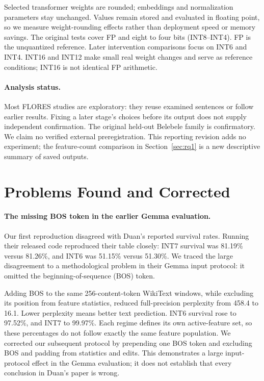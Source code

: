 \documentclass[11pt]{article}
\begin{document}
Selected transformer weights are rounded; embeddings and normalization parameters stay unchanged. Values remain stored and evaluated in floating point, so we measure weight-rounding effects rather than deployment speed or memory savings. The original tests cover FP and eight to four bits (INT8--INT4). FP is the unquantized reference. Later intervention comparisons focus on INT6 and INT4. INT16 and INT12 make small real weight changes and serve as reference conditions; INT16 is not identical FP arithmetic.

\paragraph{Analysis status.}
Most FLORES studies are exploratory: they reuse examined sentences or follow earlier results. Fixing a later stage's choices before its output does not supply independent confirmation. The original held-out Belebele family is confirmatory. We claim no verified external preregistration. This reporting revision adds no experiment; the feature-count comparison in Section~\ref{sec:rq1} is a new descriptive summary of saved outputs.

\section{Problems Found and Corrected}
\paragraph{The missing BOS token in the earlier Gemma evaluation.}
Our first reproduction disagreed with Duan's reported survival rates. Running their released code reproduced their table closely: INT7 survival was 81.19\% versus 81.26\%, and INT6 was 51.15\% versus 51.30\%. We traced the large disagreement to a methodological problem in their Gemma input protocol: it omitted the beginning-of-sequence (BOS) token.

Adding BOS to the same 256-content-token WikiText windows, while excluding its position from feature statistics, reduced full-precision perplexity from 458.4 to 16.1. Lower perplexity means better text prediction. INT6 survival rose to 97.52\%, and INT7 to 99.97\%. Each regime defines its own active-feature set, so these percentages do not follow exactly the same feature population. We corrected our subsequent protocol by prepending one BOS token and excluding BOS and padding from statistics and edits. This demonstrates a large input-protocol effect in the Gemma evaluation; it does not establish that every conclusion in Duan's paper is wrong.
\end{document}
